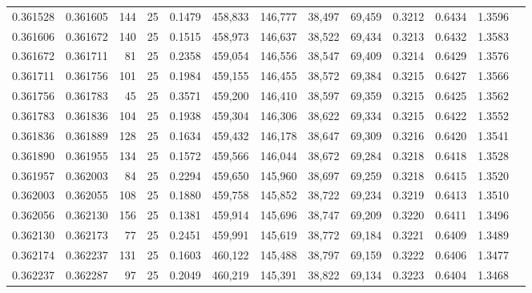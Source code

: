 \begin{tabular}{rrrrrrrrrrrrr}
0.361528 & 0.361605 &   144 &  25 &                                     0.1479 & 458,833 & 146,777 &  38,497 &  69,459 & 0.3212 & 0.6434 & 1.3596 \\
0.361606 & 0.361672 &   140 &  25 &                                     0.1515 & 458,973 & 146,637 &  38,522 &  69,434 & 0.3213 & 0.6432 & 1.3583 \\
0.361672 & 0.361711 &    81 &  25 &                                     0.2358 & 459,054 & 146,556 &  38,547 &  69,409 & 0.3214 & 0.6429 & 1.3576 \\
0.361711 & 0.361756 &   101 &  25 &                                     0.1984 & 459,155 & 146,455 &  38,572 &  69,384 & 0.3215 & 0.6427 & 1.3566 \\
0.361756 & 0.361783 &    45 &  25 &                                     0.3571 & 459,200 & 146,410 &  38,597 &  69,359 & 0.3215 & 0.6425 & 1.3562 \\
0.361783 & 0.361836 &   104 &  25 &                                     0.1938 & 459,304 & 146,306 &  38,622 &  69,334 & 0.3215 & 0.6422 & 1.3552 \\
0.361836 & 0.361889 &   128 &  25 &                                     0.1634 & 459,432 & 146,178 &  38,647 &  69,309 & 0.3216 & 0.6420 & 1.3541 \\
0.361890 & 0.361955 &   134 &  25 &                                     0.1572 & 459,566 & 146,044 &  38,672 &  69,284 & 0.3218 & 0.6418 & 1.3528 \\
0.361957 & 0.362003 &    84 &  25 &                                     0.2294 & 459,650 & 145,960 &  38,697 &  69,259 & 0.3218 & 0.6415 & 1.3520 \\
0.362003 & 0.362055 &   108 &  25 &                                     0.1880 & 459,758 & 145,852 &  38,722 &  69,234 & 0.3219 & 0.6413 & 1.3510 \\
0.362056 & 0.362130 &   156 &  25 &                                     0.1381 & 459,914 & 145,696 &  38,747 &  69,209 & 0.3220 & 0.6411 & 1.3496 \\
0.362130 & 0.362173 &    77 &  25 &                                     0.2451 & 459,991 & 145,619 &  38,772 &  69,184 & 0.3221 & 0.6409 & 1.3489 \\
0.362174 & 0.362237 &   131 &  25 &                                     0.1603 & 460,122 & 145,488 &  38,797 &  69,159 & 0.3222 & 0.6406 & 1.3477 \\
0.362237 & 0.362287 &    97 &  25 &                                     0.2049 & 460,219 & 145,391 &  38,822 &  69,134 & 0.3223 & 0.6404 & 1.3468 \\

\end{tabular}

